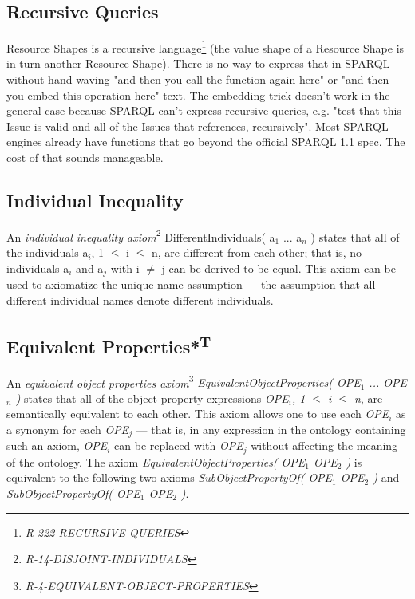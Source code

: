 \documentclass{llncs}
\begin{document}
\subsection{Recursive Queries}

Resource Shapes is a recursive language\footnote{\emph{R-222-RECURSIVE-QUERIES}} (the value shape of a Resource Shape is in turn another Resource Shape). 
There is no way to express that in SPARQL without hand-waving "and then you call the function again here" or "and then you embed this operation here" text.  
The embedding trick doesn't work
in the general case because SPARQL can't express recursive queries,
e.g. "test that this Issue is valid and all of the Issues that references, recursively".
Most SPARQL engines already have
functions that go beyond the official SPARQL 1.1 spec. 
The cost of that sounds manageable.

\subsection{Individual Inequality}

An \emph{individual inequality axiom}\footnote{\emph{R-14-DISJOINT-INDIVIDUALS}} DifferentIndividuals( a$_1$ ... a$_n$ ) states that all of the individuals a$_i$, 1 $\leq$ i $\leq$ n, are different from each other; 
that is, no individuals a$_i$ and a$_j$ with i $\neq$ j can be derived to be equal. 
This axiom can be used to axiomatize the unique name assumption — the assumption that all different individual names denote different individuals. 

\subsection{Equivalent Properties*\textsuperscript{T}}

An \emph{equivalent object properties axiom}\footnote{\emph{R-4-EQUIVALENT-OBJECT-PROPERTIES}} \emph{EquivalentObjectProperties( OPE$_1$ ... OPE$_n$ )} states that all of the object property expressions \emph{OPE$_i$, 1 $\leq$ i $\leq$ n}, are semantically equivalent to each other. This axiom allows one to use each \emph{OPE$_i$} as a synonym for each \emph{OPE$_j$} — that is, in any expression in the ontology containing such an axiom, \emph{OPE$_i$} can be replaced with \emph{OPE$_j$} without affecting the meaning of the ontology. The axiom \emph{EquivalentObjectProperties( OPE$_1$ OPE$_2$ )} is equivalent to the following two axioms \emph{SubObjectPropertyOf( OPE$_1$ OPE$_2$ )} and \emph{SubObjectPropertyOf( OPE$_1$ OPE$_2$ )}.
\end{document}
